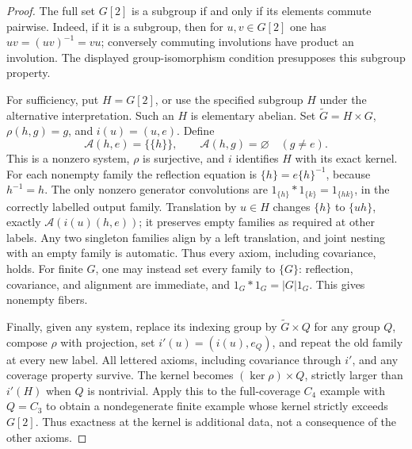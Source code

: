 \begin{proof}
The full set $G[2]$ is a subgroup if and only if its elements commute pairwise. Indeed, if it is a subgroup, then for $u,v\in G[2]$ one has $uv=(uv)^{-1}=vu$; conversely commuting involutions have product an involution. The displayed group-isomorphism condition presupposes this subgroup property.

For sufficiency, put $H=G[2]$, or use the specified subgroup $H$ under the alternative interpretation. Such an $H$ is elementary abelian. Set $\widetilde G=H\times G$, $\rho(h,g)=g$, and $i(u)=(u,e)$. Define
\[
\mathcal A(h,e)=\{\{h\}\},\qquad
\mathcal A(h,g)=\varnothing\quad(g\ne e).
\]
This is a nonzero system, $\rho$ is surjective, and $i$ identifies $H$ with its exact kernel. For each nonempty family the reflection equation is $\{h\}=e\{h\}^{-1}$, because $h^{-1}=h$. The only nonzero generator convolutions are $1_{\{h\}}*1_{\{k\}}=1_{\{hk\}}$, in the correctly labelled output family. Translation by $u\in H$ changes $\{h\}$ to $\{uh\}$, exactly $\mathcal A(i(u)(h,e))$; it preserves empty families as required at other labels. Any two singleton families align by a left translation, and joint nesting with an empty family is automatic. Thus every axiom, including covariance, holds. For finite $G$, one may instead set every family to $\{G\}$: reflection, covariance, and alignment are immediate, and $1_G*1_G=|G|1_G$. This gives nonempty fibers.

Finally, given any system, replace its indexing group by $\widetilde G\times Q$ for any group $Q$, compose $\rho$ with projection, set $i'(u)=(i(u),e_Q)$, and repeat the old family at every new label. All lettered axioms, including covariance through $i'$, and any coverage property survive. The kernel becomes $(\ker\rho)\times Q$, strictly larger than $i'(H)$ when $Q$ is nontrivial. Apply this to the full-coverage $C_4$ example with $Q=C_3$ to obtain a nondegenerate finite example whose kernel strictly exceeds $G[2]$. Thus exactness at the kernel is additional data, not a consequence of the other axioms.
\end{proof}

